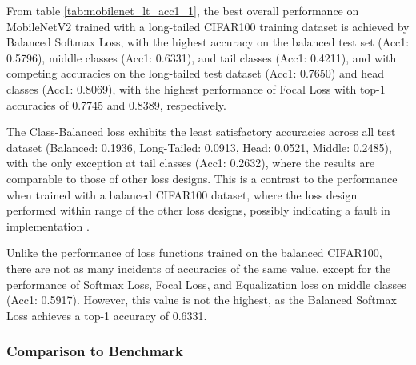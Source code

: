 
From table \ref{tab:mobilenet_lt_acc1_1}, the best overall performance on MobileNetV2 trained with a long-tailed CIFAR100 training dataset is achieved by Balanced Softmax Loss, with the highest accuracy on the balanced test set (Acc1: 0.5796), middle classes (Acc1: 0.6331), and tail classes (Acc1: 0.4211), and with competing accuracies on the long-tailed test dataset (Acc1: 0.7650) and head classes (Acc1: 0.8069), with the highest performance of Focal Loss with top-1 accuracies of 0.7745 and 0.8389, respectively.

The Class-Balanced loss exhibits the least satisfactory accuracies across all test dataset (Balanced: 0.1936, Long-Tailed: 0.0913, Head: 0.0521, Middle: 0.2485), with the only exception at tail classes (Acc1: 0.2632), where the results are comparable to those of other loss designs. This is a contrast to the performance when trained with a balanced CIFAR100 dataset, where the loss design performed within range of the other loss designs, possibly indicating a fault in implementation .

Unlike the performance of loss functions trained on the balanced CIFAR100, there are not as many incidents of accuracies of the same value, except for the performance of Softmax Loss, Focal Loss, and Equalization loss on middle classes (Acc1: 0.5917). However, this value is not the highest, as the Balanced Softmax Loss achieves a top-1 accuracy of 0.6331. 

\subsubsection{Comparison to Benchmark}




